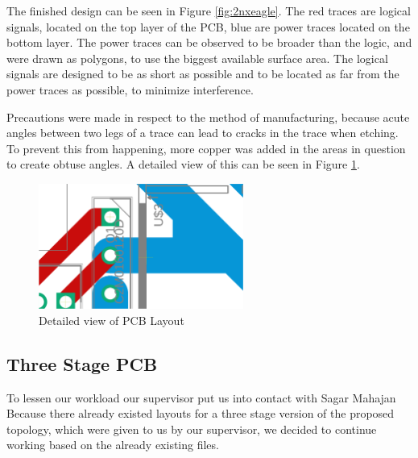 The finished design can be seen in Figure \ref{fig:2nxeagle}.
The red traces are logical signals,
located on the top layer of the PCB,
blue are power traces located on the bottom layer.
The power traces can be observed to be broader than the logic,
and were drawn as polygons,
to use the biggest available surface area.
The logical signals are designed to be as short as possible
and to be located as far from the power traces as possible,
to minimize interference.

Precautions were made in respect to the method of manufacturing,
because acute angles between two legs of a trace can lead to cracks in the trace when etching.
To prevent this from happening,
more copper was added in the areas in question to create obtuse angles.
A detailed view of this can be seen in Figure \ref{fig:2nxeagledetail}.
\begin{figure}[H]
	\begin{center}
	\includegraphics[width=0.6\textwidth]{figures/05cPCBdesign/2NX_interleaved_boost_converter_EAGLE_BY_DANIEL_DETAIL.pdf}
	\end{center}
	\caption{Detailed view of PCB Layout}
	\label{fig:2nxeagledetail}
\end{figure}

\subsection{Three Stage PCB}\label{sub:3sPCB}
To lessen our workload our supervisor put us into contact with Sagar Mahajan 
Because there already existed layouts for a three stage version of the proposed topology,
which were given to us by our supervisor,
we decided to continue working based on the already existing files.
